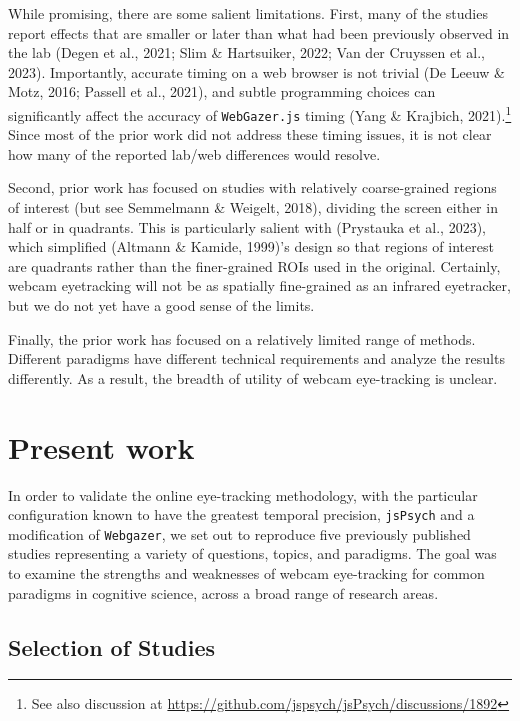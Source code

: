 \documentclass[
  man,floatsintext]{apa6}
\begin{document}
While promising, there are some salient limitations. First, many of the studies report effects that are smaller or later than what had been previously observed in the lab (Degen et al., 2021; Slim \& Hartsuiker, 2022; Van der Cruyssen et al., 2023). Importantly, accurate timing on a web browser is not trivial (De Leeuw \& Motz, 2016; Passell et al., 2021), and subtle programming choices can significantly affect the accuracy of \texttt{WebGazer.js} timing (Yang \& Krajbich, 2021).\footnote{See also discussion at \url{https://github.com/jspsych/jsPsych/discussions/1892}} Since most of the prior work did not address these timing issues, it is not clear how many of the reported lab/web differences would resolve.

Second, prior work has focused on studies with relatively coarse-grained regions of interest (but see Semmelmann \& Weigelt, 2018), dividing the screen either in half or in quadrants. This is particularly salient with (Prystauka et al., 2023), which simplified (Altmann \& Kamide, 1999)'s design so that regions of interest are quadrants rather than the finer-grained ROIs used in the original. Certainly, webcam eyetracking will not be as spatially fine-grained as an infrared eyetracker, but we do not yet have a good sense of the limits.

Finally, the prior work has focused on a relatively limited range of methods. Different paradigms have different technical requirements and analyze the results differently. As a result, the breadth of utility of webcam eye-tracking is unclear.

\section{Present work}\label{present-work}

In order to validate the online eye-tracking methodology, with the particular configuration known to have the greatest temporal precision, \texttt{jsPsych} and a modification of \texttt{Webgazer}, we set out to reproduce five previously published studies representing a variety of questions, topics, and paradigms. The goal was to examine the strengths and weaknesses of webcam eye-tracking for common paradigms in cognitive science, across a broad range of research areas.

\subsection{Selection of Studies}\label{selection-of-studies}
\end{document}
